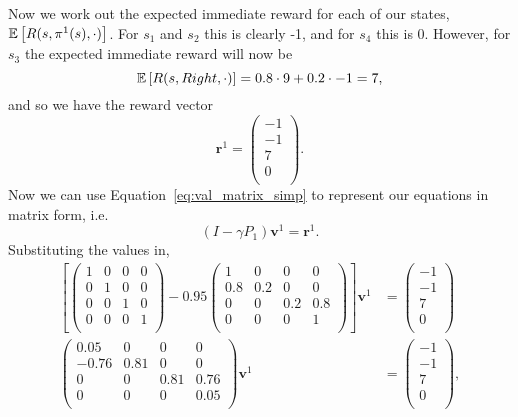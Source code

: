 \documentclass[a4paper]{article}
\begin{document}
Now we work out the expected immediate reward for each of our states,
$\mathbb{E} \left[{R(s, \pi^1(s), \cdot)}\right]$.
For $s_1$ and $s_2$ this is clearly -1, and for $s_4$ this is 0.
However, for $s_3$ the expected immediate reward will now be
\begin{equation*}
  \mathbb{E} \left[{R(s, Right, \cdot)}\right] = 0.8 \cdot 9 + 0.2 \cdot -1 = 7 ,
\end{equation*}
and so we have the reward vector
\begin{equation*}
  \mathbf{r}^1 = \begin{pmatrix}
    -1 \\ -1 \\ 7 \\ 0 \\
  \end{pmatrix} .
\end{equation*}
Now we can use Equation~\ref{eq:val_matrix_simp} to represent our
equations in matrix form, i.e.
\begin{equation}
  (I - \gamma P_1) \mathbf{v}^1 = \mathbf{r}^1 .
\end{equation}
Substituting the values in,
\begin{align*}
  \left[
    \begin{pmatrix}
      1 & 0 & 0 & 0 \\
      0 & 1 & 0 & 0 \\
      0 & 0 & 1 & 0 \\
      0 & 0 & 0 & 1 \\
    \end{pmatrix}
    - 0.95
    \begin{pmatrix}
      1   & 0   & 0   & 0   \\
      0.8 & 0.2 & 0   & 0   \\
      0   & 0   & 0.2 & 0.8 \\
      0   & 0   & 0   & 1   \\
    \end{pmatrix}
  \right]
  \mathbf{v}^1 &=
  \begin{pmatrix}
    -1 \\ -1 \\ 7 \\ 0 \\
  \end{pmatrix} \\
  \begin{pmatrix}
    0.05  & 0     & 0    & 0    \\
    -0.76 & 0.81  & 0    & 0    \\
    0     & 0     & 0.81 & 0.76 \\
    0     & 0     & 0    & 0.05 \\
  \end{pmatrix}
  \mathbf{v}^1 &=
  \begin{pmatrix}
    -1 \\ -1 \\ 7 \\ 0 \\
  \end{pmatrix} ,
\end{align*}
\end{document}
